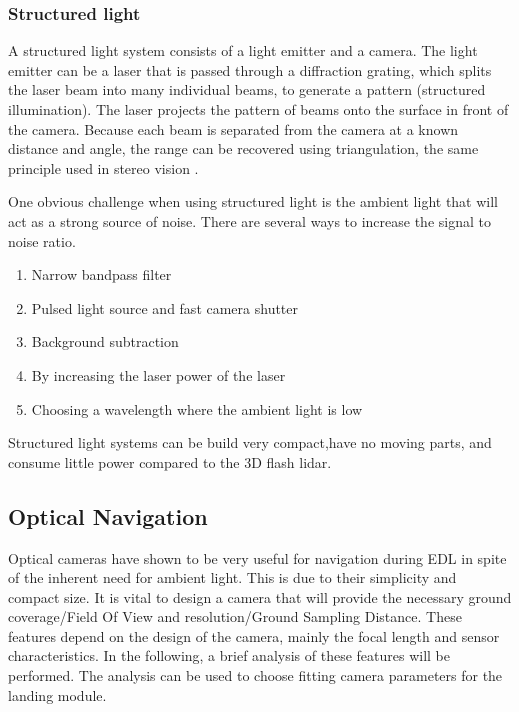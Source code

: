 \subsubsection{Structured light}

A structured light system consists of a light emitter and a camera. The light emitter can be a laser that is passed through a diffraction grating, which splits the laser beam into many individual beams, to generate a pattern (structured illumination). The laser projects the pattern of beams onto the surface in front of the camera. Because each beam is separated from the camera at a known distance and angle, the range can be recovered using triangulation, the same principle used in stereo vision \cite{structuredlight}.

One obvious challenge when using structured light is the ambient light that will act as a strong source of noise. There are several ways to increase the signal to noise ratio. 

\begin{enumerate}

\item Narrow bandpass filter
\item Pulsed light source and fast camera shutter
\item Background subtraction
\item By increasing the laser power of the laser
\item Choosing a wavelength where the ambient light is low

\end{enumerate}

Structured light systems can be build very compact,have no moving parts, and consume little power compared to the 3D flash lidar. 

\subsection{Optical Navigation}

Optical cameras have shown to be very useful for navigation during EDL in spite of the inherent need for ambient light. This is due to their simplicity and compact size. It is vital to design a camera that will provide the necessary ground coverage/Field Of View and resolution/Ground Sampling Distance. These features depend on the design of the camera, mainly the focal length and sensor characteristics. In the following, a brief analysis of these features will be performed. The analysis can be used to choose fitting camera parameters for the landing module. \\

